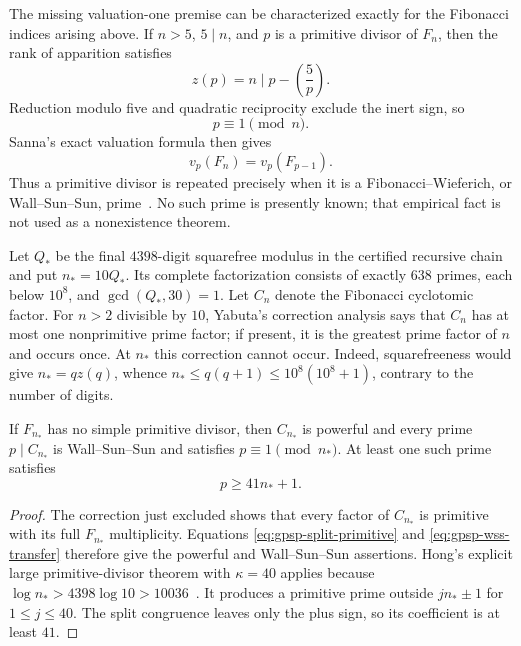 The missing valuation-one premise can be characterized exactly for the
Fibonacci indices arising above.  If $n>5$, $5\mid n$, and $p$ is a primitive
divisor of $F_n$, then the rank of apparition satisfies
\[
 z(p)=n\mid p-\left(\frac5p\right).
\]
Reduction modulo five and quadratic reciprocity exclude the inert sign, so
\begin{equation}\label{eq:gpsp-split-primitive}
                         p\equiv1\pmod n.
\end{equation}
Sanna's exact valuation formula then gives
\begin{equation}\label{eq:gpsp-wss-transfer}
                  v_p(F_n)=v_p(F_{p-1}).
\end{equation}
Thus a primitive divisor is repeated precisely when it is a
Fibonacci--Wieferich, or Wall--Sun--Sun, prime~\cite{Sanna2016,BragmanRowland2025}.
No such prime is presently known; that empirical fact is not used as a
nonexistence theorem.

Let $Q_*$ be the final $4398$-digit squarefree modulus in the certified
recursive chain and put $n_*=10Q_*$.  Its complete factorization consists of
exactly $638$ primes, each below $10^8$, and $\gcd(Q_*,30)=1$.  Let $C_n$
denote the Fibonacci cyclotomic factor.  For $n>2$ divisible by $10$,
Yabuta's correction analysis says that $C_n$ has at most one nonprimitive
prime factor; if present, it is the greatest prime factor of $n$ and occurs
once.  At $n_*$ this correction cannot occur.  Indeed,
squarefreeness would give $n_*=qz(q)$, whence
$n_*\le q(q+1)\le10^8(10^8+1)$, contrary to the number of digits.

\begin{theorem}
\label{thm:gpsp-wss-packet}
If $F_{n_*}$ has no simple primitive divisor, then $C_{n_*}$ is powerful and
every prime $p\mid C_{n_*}$ is Wall--Sun--Sun and satisfies
$p\equiv1\pmod {n_*}$.  At least one such prime satisfies
\[
                              p\ge41n_*+1.
\]
\end{theorem}

\begin{proof}
The correction just excluded shows that every factor of $C_{n_*}$ is
primitive with its full $F_{n_*}$ multiplicity.  Equations
\eqref{eq:gpsp-split-primitive} and \eqref{eq:gpsp-wss-transfer} therefore
give the powerful and Wall--Sun--Sun assertions.  Hong's explicit large
primitive-divisor theorem with $\kappa=40$ applies because
$\log n_*>4398\log10>10036$~\cite{Hong2025}.  It produces a primitive prime
outside $jn_*\pm1$ for $1\le j\le40$.  The split congruence leaves only the
plus sign, so its coefficient is at least $41$.
\end{proof}

